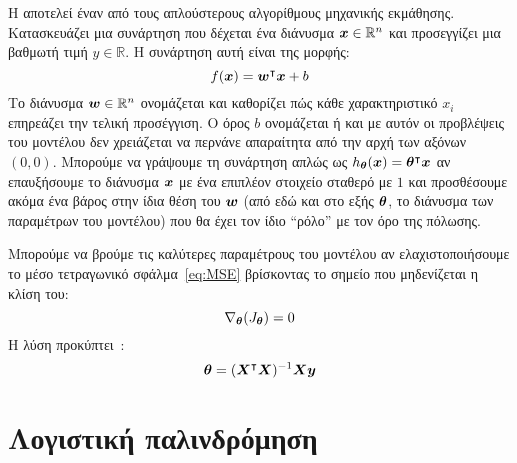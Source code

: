 Η  αποτελεί έναν από τους απλούστερους αλγορίθμους μηχανικής εκμάθησης.
Κατασκευάζει μια συνάρτηση που δέχεται ένα διάνυσμα $\vx \in \mathbb{R}^n$ και προσεγγίζει μια βαθμωτή τιμή $y \in \mathbb{R}$.
Η συνάρτηση αυτή είναι της μορφής:
\begin{equation}
    \label{eq:linear-regression}
    f(\vx) = \vw^\intercal \vx + b
\end{equation}
Το διάνυσμα $\vw \in \mathbb{R}^n$ ονομάζεται  και καθορίζει πώς κάθε χαρακτηριστικό $x_i$ επηρεάζει την τελική προσέγγιση.
Ο όρος $b$ ονομάζεται  ή  και με αυτόν οι προβλέψεις του μοντέλου δεν χρειάζεται να περνάνε απαραίτητα από την αρχή των αξόνων $(0, 0)$.
Μπορούμε να γράψουμε τη συνάρτηση απλώς ως $\hth(\vx) = \vth^\intercal \vx$ αν επαυξήσουμε το διάνυσμα $\vx$ με ένα επιπλέον στοιχείο σταθερό με $1$ και προσθέσουμε ακόμα ένα βάρος στην ίδια θέση του $\vw$
(από εδώ και στο εξής $\vth$, το διάνυσμα των παραμέτρων του μοντέλου)
που θα έχει τον ίδιο \enquote{ρόλο} με τον όρο της πόλωσης.

Μπορούμε να βρούμε τις καλύτερες παραμέτρους του μοντέλου αν ελαχιστοποιήσουμε το μέσο τετραγωνικό σφάλμα~\ref{eq:MSE} βρίσκοντας το σημείο που μηδενίζεται η κλίση του:
\begin{equation}
    \nabla_{\vth}(J_{\vth}) = 0
\end{equation}
Η λύση προκύπτει~\cite{Goodfellow-et-al-2016}:
\begin{equation}
    \vth = (\vX^\intercal \vX)^{-1} \vX \vec{y}
\end{equation}

\section{Λογιστική παλινδρόμηση}\label{sec:logistic-regression}

